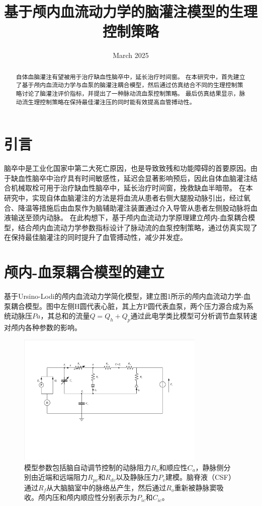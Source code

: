 \documentclass[12pt]{article}
\title{基于颅内血流动力学的脑灌注模型的生理控制策略}
\author{}
\date{March 2025}
\begin{document}
\begin{abstract}
    自体血脑灌注有望被用于治疗缺血性脑卒中，延长治疗时间窗。
    在本研究中，首先建立了基于颅内血流动力学与血泵的脑灌注耦合模型，然后通过仿真结合不同的生理控制策略讨论了脑灌注评价指标，并提出了一种脉动流血泵控制策略。
    最后仿真结果显示，脉动流生理控制策略在保持最佳灌注压的同时能有效提高血管搏动性。

\end{abstract}

\section{引言}
脑卒中是工业化国家中第二大死亡原因，也是导致致残和功能障碍的首要原因。由于缺血性脑卒中治疗具有时间敏感性，延迟会显著影响预后，因此自体血脑灌注结合机械取栓可用于治疗缺血性脑卒中，延长治疗时间窗，挽救缺血半暗带。
在本研究中，实现自体血脑灌注的方法是将血流从患者右侧大腿股动脉引出，经过氧合、降温等措施后由血泵作为脑辅助灌注装置通过介入导管从患者左侧股动脉将血液输送至颈内动脉。
在此构想下，基于颅内血流动力学原理建立颅内-血泵耦合模型，结合颅内血流动力学参数指标设计了脉动流的血泵控制策略，通过仿真实现了在保持最佳脑灌注的同时提升了血管搏动性，减少并发症。

\section{颅内-血泵耦合模型的建立}
基于Ursino-Lodi的颅内血流动力学简化模型，建立图1所示的颅内血流动力学-血泵耦合模型。图中左侧H圆代表心脏，其上方P圆代表血泵，两个压力源合成为系统动脉压$Pa$，其总和的流量$Q = Q_h + Q_p$通过此电学类比模型可分析调节血泵转速对颅内各种参数的影响。

\begin{figure}[h]
    \centering
    \includegraphics[width=0.8\textwidth]{figures/基于颅内压指标的脑灌注模型.pdf}
    \caption{模型参数包括脑自动调节控制的动脉阻力$R_a$和顺应性$C_a$，静脉侧分别由近端和远端阻力$R_{pv}$和$R_{dv}$以及静脉压力$P_v$建模。脑脊液（CSF）通过$R_f$从大脑脑室中的脉络丛产生，然后通过$R_o$重新被静脉窦吸收。颅内压和颅内顺应性分别表示为$P_{ic}$和$C_{ic}$。}
    \label{fig:brain_perfusion_model}
\end{figure}
\end{document}
